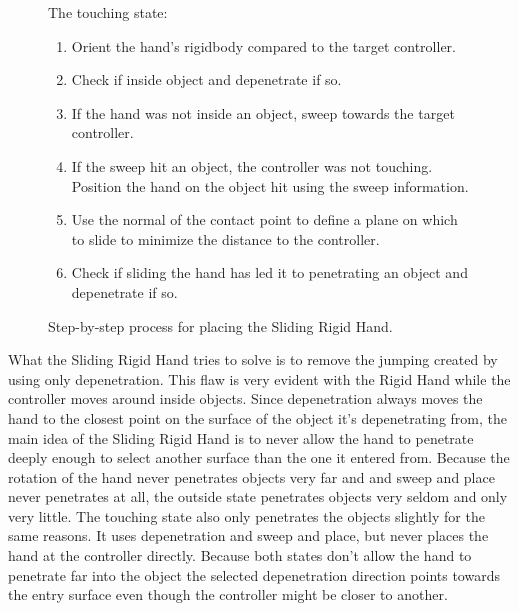 \begin{figure}[H]
\begin{minipage}[t]{0.49\textwidth}
\footnotesize
The touching state:
\begin{enumerate}[noitemsep]
\item Orient the hand's rigidbody compared to the target controller.
\item Check if inside object and depenetrate if so.
\item If the hand was not inside an object, sweep towards the target controller.
\item If the sweep hit an object, the controller was not touching. Position the hand on the object hit using the sweep information.
\item Use the normal of the contact point to define a plane on which to slide to minimize the distance to the controller.
\item Check if sliding the hand has led it to penetrating an object and depenetrate if so.
\end{enumerate}
\end{minipage}
\caption{Step-by-step process for placing the Sliding Rigid Hand.}
\label{fig:stepByStepSlidingRigidHand}
\end{figure}

What the Sliding Rigid Hand tries to solve is to remove the jumping created by using only depenetration. This flaw is very evident with the Rigid Hand while the controller moves around inside objects. Since depenetration always moves the hand to the closest point on the surface of the object it's depenetrating from, the main idea of the Sliding Rigid Hand is to never allow the hand to penetrate deeply enough to select another surface than the one it entered from. Because the rotation of the hand never penetrates objects very far and and sweep and place never penetrates at all, the outside state penetrates objects very seldom and only very little. The touching state also only penetrates the objects slightly for the same reasons. It uses depenetration and sweep and place, but never places the hand at the controller directly. Because both states don't allow the hand to penetrate far into the object the selected depenetration direction points towards the entry surface even though the controller might be closer to another.

